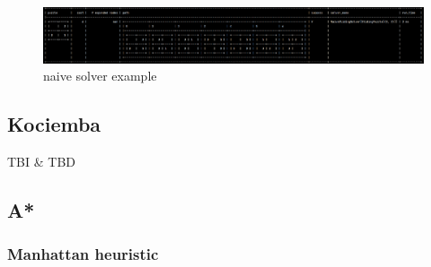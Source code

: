 \begin{figure}[H]
\centering
\includegraphics[scale=0.39]{./Figures/examplenaivesolver}
\caption[Examples]{naive solver example}
\label{fig:examplenaivesolver}
\end{figure}



\subsection{Kociemba}
TBI \& TBD


\subsection{A*}
\label{ASSS}

\subsubsection{Manhattan heuristic}



\afblue
